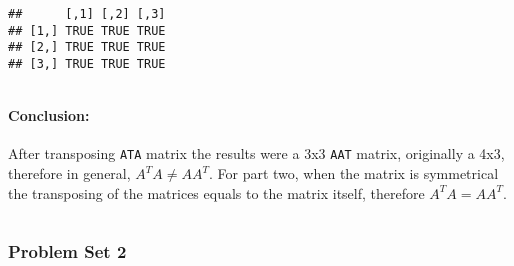 \documentclass[
]{article}
\begin{document}
\begin{verbatim}
##      [,1] [,2] [,3]
## [1,] TRUE TRUE TRUE
## [2,] TRUE TRUE TRUE
## [3,] TRUE TRUE TRUE
\end{verbatim}

\(~\)

\hypertarget{conclusion}{%
\paragraph{Conclusion:}\label{conclusion}}

After transposing \texttt{ATA} matrix the results were a 3x3
\texttt{AAT} matrix, originally a 4x3, therefore in general,
\(A^TA \ne AA^T\). For part two, when the matrix is symmetrical the
transposing of the matrices equals to the matrix itself, therefore
\emph{\(A^TA = AA^T\)}.

\(~\)

\hypertarget{problem-set-2}{%
\subsubsection{Problem Set 2}\label{problem-set-2}}
\end{document}
